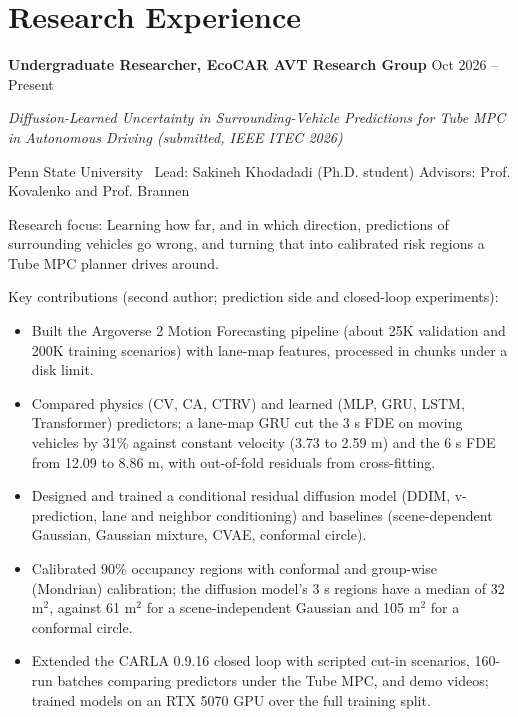 \documentclass[11pt,a4paper]{article}
\begin{document}
\section*{Research Experience}

\textbf{Undergraduate Researcher, EcoCAR AVT Research Group} \hfill Oct 2026 -- Present

\textit{Diffusion-Learned Uncertainty in Surrounding-Vehicle Predictions for Tube MPC in Autonomous Driving (submitted, IEEE ITEC 2026)}

Penn State University \
Lead: Sakineh Khodadadi (Ph.D. student) \quad Advisors: Prof. Kovalenko and Prof. Brannen

\vspace{0.3em}

Research focus:
Learning how far, and in which direction, predictions of surrounding vehicles go wrong, and turning that into calibrated risk regions a Tube MPC planner drives around.

\vspace{0.3em}

Key contributions (second author; prediction side and closed-loop experiments):

\begin{itemize}[leftmargin=1.5em]

\item Built the Argoverse 2 Motion Forecasting pipeline (about 25K validation and 200K training scenarios) with lane-map features, processed in chunks under a disk limit.

\item Compared physics (CV, CA, CTRV) and learned (MLP, GRU, LSTM, Transformer) predictors; a lane-map GRU cut the 3 s FDE on moving vehicles by 31\% against constant velocity (3.73 to 2.59 m) and the 6 s FDE from 12.09 to 8.86 m, with out-of-fold residuals from cross-fitting.

\item Designed and trained a conditional residual diffusion model (DDIM, v-prediction, lane and neighbor conditioning) and baselines (scene-dependent Gaussian, Gaussian mixture, CVAE, conformal circle).

\item Calibrated 90\% occupancy regions with conformal and group-wise (Mondrian) calibration; the diffusion model's 3 s regions have a median of 32 m$^2$, against 61 m$^2$ for a scene-independent Gaussian and 105 m$^2$ for a conformal circle.

\item Extended the CARLA 0.9.16 closed loop with scripted cut-in scenarios, 160-run batches comparing predictors under the Tube MPC, and demo videos; trained models on an RTX 5070 GPU over the full training split.

\end{itemize}
\end{document}

